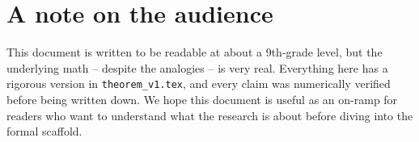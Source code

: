 \documentclass[11pt]{article}
\begin{document}
\section*{A note on the audience}

This document is written to be readable at about a 9th-grade level,
but the underlying math -- despite the analogies -- is very real.
Everything here has a rigorous version in \texttt{theorem\_v1.tex}, and
every claim was numerically verified before being written down. We
hope this document is useful as an on-ramp for readers who want to
understand what the research is about before diving into the formal
scaffold.
\end{document}
